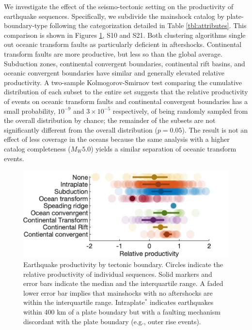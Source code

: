 \documentclass[draft, jgrga]{agujournal2018}
\begin{document}
    We investigate the effect of the seismo-tectonic setting on the productivity of earthquake sequences. Specifically, we subdivide the mainshock catalog by plate-boundary-type following the categorization detailed in Table \ref{tbl:attributes}. This comparison is shown in Figures \ref{fig:plate_boundary}, S10 and S21. Both clustering algorithms single out oceanic transform faults as particularly deficient in aftershocks. Continental transform faults are more productive, but less so than the global average. Subduction zones, continental convergent boundaries, continental rift basins, and oceanic convergent boundaries have similar and generally elevated relative productivity. A two-sample Kolmogorov-Smirnov test comparing the cumulative distribution of each subset to the entire set suggests that the relative productivity of events on oceanic transform faults and continental convergent boundaries has a small probability, $10^{-9}$ and $3\times10^{-5}$ respectively, of being randomly sampled from the overall distribution by chance; the remainder of the subsets are not significantly different from the overall distribution ($p = 0.05$). The result is not an effect of less coverage in the oceans because the same analysis with a higher catalog completeness ($M_W5.0$) yields a similar separation of oceanic transform events.

    \begin{figure}
        \centering
        \includegraphics{prod_by_pb.png}
        \caption{Earthquake productivity by tectonic boundary. Circles indicate the relative productivity of individual sequences. Solid markers and error bars indicate the median and the interquartile range. A faded lower error bar implies that mainshocks with no aftershocks are within the interquartile range. Intraplate$^*$ indicates earthquakes within 400 km of a plate boundary but with a faulting mechanism discordant with the plate boundary (e.g., outer rise events).}
        \label{fig:plate_boundary}
    \end{figure}
\end{document}
